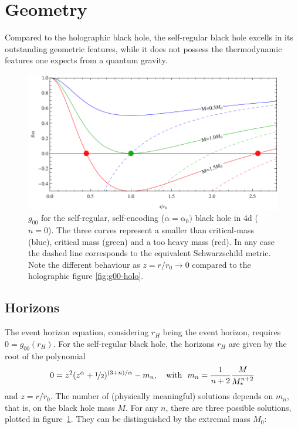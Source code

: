 \documentclass[12pt,a4paper]{report}
\numberwithin{equation}{chapter}
\begin{document}
\clearpage

\section{Geometry}\label{sec:geometry-halpha}
Compared to the holographic black hole, the self-regular black hole excells in its outstanding geometric features, while it does not possess the thermodynamic features one expects from a quantum gravity.

\begin{figure}[h!]
\includegraphics[scale=1]{figures/remnant-plot-halpha-alpha0.pdf}
\caption[$g_{00}$ for the self-regular black hole with $n=0, \alpha=\alpha_0$ and $M\in\{0.5,1,1.5\}/G$]{%
%
$g_{00}$ for the self-regular, self-encoding ($\alpha=\alpha_0)$ black hole in 4d ($n=0$). The three curves represent a smaller than critical-mass (blue), critical mass (green) and a too heavy mass (red). In any case the dashed line corresponds to the equivalent Schwarzschild metric. Note the different behaviour as $z=r/r_0\to 0$ compared to the holographic figure \ref{fig:g00-holo}.
}\label{fig:g00-halpha}
\end{figure}

\subsection{Horizons}\label{sec:horizons}
The event horizon equation, considering $r_H$ being the event horizon, requires $0 = g_{00}(r_H)$. For the self-regular black hole, the horizons $r_H$ are given by the root of the polynomial
\begin{equation}\label{eq:halpha-horizons}
0 = z^2 (z^\alpha + \nicefrac 12)^{(3+n)/\alpha} - m_n,
\quad\text{with}~~ m_n = \frac 1{n+2} \frac M{M_*^{n+2}}
\end{equation}
and $z=r/\tilde r_0$. The number of (physically meaningful) solutions depends on $m_n$, that is, on the black hole mass $M$. For any $n$, there are three possible solutions, plotted in figure~\ref{fig:g00-halpha}. They can be distinguished by the extremal mass $M_0$:
\end{document}
